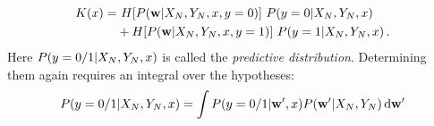\begin{align}
	K(x) =&~ H[{P({\bf w} | X_N, Y_N, x, y = 0)}] ~
	{P(y = 0 | X_N, Y_N, x)} \\
	&+
	H[{P({\bf w} | X_N, Y_N, x, y = 1)}] ~
	{P(y = 1 | X_N, Y_N, x)} \,.
\end{align}
Here ${P(y = 0/1 | X_N, Y_N, x)}$ is called the \emph{predictive distribution}. Determining them again requires an integral over the hypotheses:
\begin{align}
	{P(y = 0/1 | X_N, Y_N, x)}
	= \int {P(y = 0/1 | {\bf w}', x)} {P({\bf w}' | X_N, Y_N)} \,\mathrm{d} {\bf w}'
\end{align}


